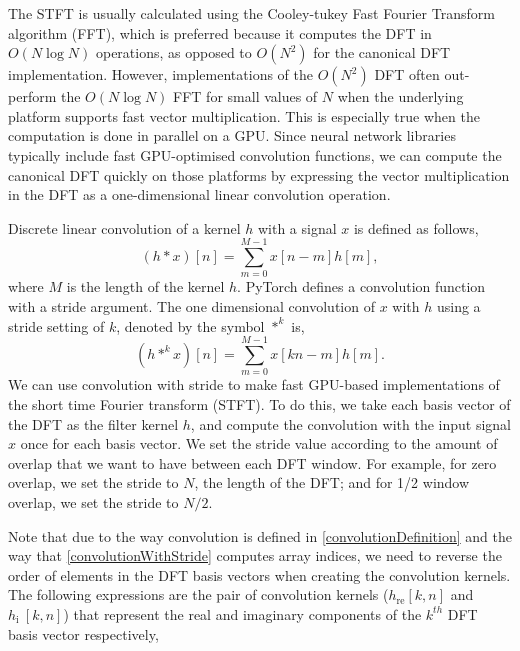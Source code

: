 \documentclass{ieeeaccess}
\begin{document}
The STFT is usually calculated using the Cooley-tukey Fast Fourier Transform algorithm (FFT), which is preferred because it computes the DFT in $O(N \log N)$ operations, as opposed to $O(N^2)$ for the canonical DFT implementation. However, implementations of the $O(N^2)$ DFT often out-perform the $O(N \log N)$ FFT for small values of $N$ when the underlying platform supports fast vector multiplication. This is especially true when the computation is done in parallel on a GPU. Since neural network libraries typically include fast GPU-optimised convolution functions, we can compute the canonical DFT quickly on those platforms by expressing the vector multiplication in the DFT as a one-dimensional linear convolution operation. 

Discrete linear convolution of a kernel $h$ with a signal $x$ is defined as follows,
\begin{equation}
    (h * x)[n] = \sum^{M-1}_{m=0}x[n-m]h[m],\label{convolutionDefinition}
\end{equation}
where $M$ is the length of the kernel $h$. PyTorch defines a convolution function with a stride argument. The one dimensional convolution of $x$ with $h$ using a stride setting of $k$, denoted by the symbol $*^k$ is,
\begin{equation}
    (h *^k x)[n] = \sum^{M-1}_{m=0}x[k n-m]h[m].\label{convolutionWithStride}
\end{equation}
We can use convolution with stride to make fast GPU-based implementations of the short time Fourier transform (STFT). To do this, we take each basis vector of the DFT as the filter kernel $h$, and compute the convolution with the input signal $x$ once for each basis vector. We set the stride value according to the amount of overlap that we want to have between each DFT window. For example, for zero overlap, we set the stride to $N$, the length of the DFT; and for 1/2 window overlap, we set the stride to $N/2$.


Note that due to the way convolution is defined in \eqref{convolutionDefinition} and the way that \eqref{convolutionWithStride} computes array indices, we need to reverse the order of elements in the DFT basis vectors when creating the convolution kernels. The following expressions are the pair of convolution kernels ($h_{\text{re}}[k,n]$ and $h_{\text{i }}[k,n]$) that represent the real and imaginary components of the $k^{th}$ DFT basis vector respectively,
\end{document}
